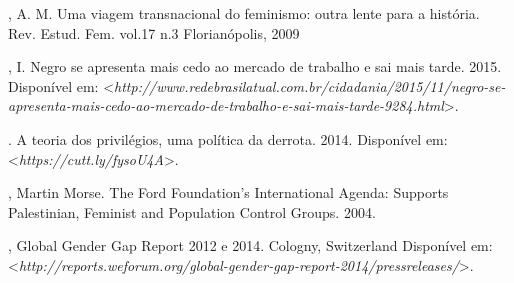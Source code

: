 \begin{Parskip}
, A. M. Uma viagem transnacional do feminismo: outra lente para a
história. Rev. Estud. Fem. vol.17 n.3 Florianópolis, 2009

, I. Negro se apresenta mais cedo ao mercado de trabalho e sai mais
tarde. 2015.
Disponível em: \textless{}\emph{http://www.redebrasilatual.com.br/cidadania/2015/11/negro-se-apresenta-mais-cedo-ao-mercado-de-trabalho-e-sai-mais-tarde-9284.html}\textgreater{}.

. A teoria dos privilégios, uma política da derrota. 2014.
Disponível em: \textless{}\emph{https://cutt.ly/fysoU4A}\textgreater{}.

, Martin Morse. The Ford Foundation's International Agenda:
Supports Palestinian, Feminist and Population Control Groups. 2004.

, Global Gender Gap Report 2012 e 2014. Cologny,
Switzerland
Disponível em: \textless{}\emph{http://reports.weforum.org/global-gender-gap-report-2014/pressreleases/}\textgreater{}.
\end{Parskip}